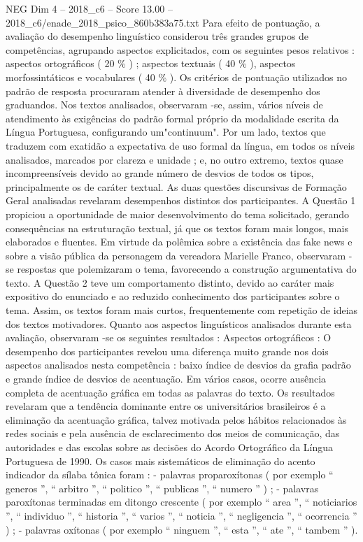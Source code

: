 \begin{textsample}{NEG Dim 4 – 2018\_c6 – Score 13.00 – 2018\_c6/enade\_2018\_psico\_860b383a75.txt}
Para efeito de pontuação, a avaliação do desempenho linguístico considerou três grandes grupos de competências, agrupando aspectos explicitados, com os seguintes pesos relativos : aspectos ortográficos ( 20 \% ) ; aspectos textuais ( 40 \% ), aspectos morfossintáticos e vocabulares ( 40 \% ).
Os critérios de pontuação utilizados no padrão de resposta procuraram atender à diversidade de desempenho dos graduandos.
Nos textos analisados, observaram -se, assim, vários níveis de atendimento às exigências do padrão formal próprio da modalidade escrita da Língua Portuguesa, configurando um"continuum".
Por um lado, textos que traduzem com exatidão a expectativa de uso formal da língua, em todos os níveis analisados, marcados por clareza e unidade ; e, no outro extremo, textos quase incompreensíveis devido ao grande número de desvios de todos os tipos, principalmente os de caráter textual.
As duas questões discursivas de Formação Geral analisadas revelaram desempenhos distintos dos participantes.
A Questão 1 propiciou a oportunidade de maior desenvolvimento do tema solicitado, gerando consequências na estruturação textual, já que os textos foram mais longos, mais elaborados e fluentes.
Em virtude da polêmica sobre a existência das fake news e sobre a visão pública da personagem da vereadora Marielle Franco, observaram -se respostas que polemizaram o tema, favorecendo a construção argumentativa do texto.
A Questão 2 teve um comportamento distinto, devido ao caráter mais expositivo do enunciado e ao reduzido conhecimento dos participantes sobre o tema.
Assim, os textos foram mais curtos, frequentemente com repetição de ideias dos textos motivadores.
Quanto aos aspectos linguísticos analisados durante esta avaliação, observaram -se os seguintes resultados : Aspectos ortográficos : O desempenho dos participantes revelou uma diferença muito grande nos dois aspectos analisados nesta competência : baixo índice de desvios da grafia padrão e grande índice de desvios de acentuação.
Em vários casos, ocorre ausência completa de acentuação gráfica em todas as palavras do texto.
Os resultados revelaram que a tendência dominante entre os universitários brasileiros é a eliminação da acentuação gráfica, talvez motivada pelos hábitos relacionados às redes sociais e pela ausência de esclarecimento dos meios de comunicação, das autoridades e das escolas sobre as decisões do Acordo Ortográfico da Língua Portuguesa de 1990.
Os casos mais sistemáticos de eliminação do acento indicador da sílaba tônica foram : - palavras proparoxítonas ( por exemplo “ generos ”, “ arbitro ”, “ politico ”, “ publicas ”, “ numero ” ) ; - palavras paroxítonas terminadas em ditongo crescente ( por exemplo “ area ”, “ noticiarios ”, “ individuo ”, “ historia ”, “ varios ”, “ noticia ”, “ negligencia ”, “ ocorrencia ” ) ; - palavras oxítonas ( por exemplo “ ninguem ”, “ esta ”, “ ate ”, “ tambem ” ).

\end{textsample}
